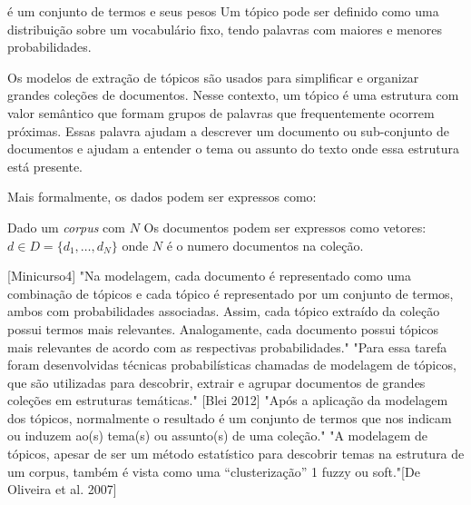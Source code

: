 

é um conjunto de termos e seus pesos 
Um tópico pode ser definido como uma distribuição sobre um vocabulário fixo, tendo palavras com maiores e menores probabilidades.

Os modelos de extração de tópicos são usados para simplificar e organizar grandes coleções de documentos. Nesse contexto, um tópico é uma estrutura com valor semântico que formam grupos de palavras que frequentemente ocorrem próximas. Essas palavra ajudam a descrever um documento ou sub-conjunto de documentos e ajudam a entender o tema ou assunto do texto onde essa estrutura está presente.


Mais formalmente, os dados podem ser expressos como:

Dado um \textit{corpus} com $N$ 
Os documentos podem ser expressos como vetores: $ d \in D = \{d_1,\dots,d_N\}$ onde $N$ é o numero documentos na coleção. 



[Minicurso4] 
"Na modelagem, cada documento é representado como uma combinação de tópicos e cada tópico é representado por um conjunto de termos, ambos com probabilidades associadas. Assim, cada tópico extraído da coleção possui termos mais relevantes. Analogamente, cada documento possui tópicos mais relevantes de acordo com as respectivas probabilidades."
"Para essa tarefa foram desenvolvidas técnicas probabilísticas chamadas de modelagem de tópicos, que são utilizadas para descobrir, extrair e agrupar documentos de grandes coleções em estruturas temáticas." [Blei 2012]
"Após a aplicação da modelagem dos tópicos, normalmente o resultado é um conjunto de termos que nos indicam ou induzem ao(s) tema(s) ou assunto(s) de uma coleção."
"A modelagem de tópicos, apesar de ser um método estatístico para descobrir temas na estrutura de um corpus, também é vista como uma “clusterização” 1 fuzzy ou soft."[De Oliveira et al. 2007]




